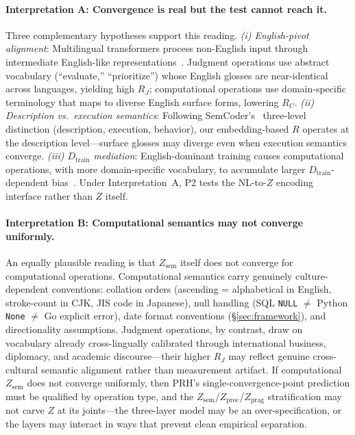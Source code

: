 \documentclass[11pt]{article}
\theoremstyle{definition}
\newcommand{\Zsem}{Z_{\text{sem}}}
\newcommand{\Zproc}{Z_{\text{proc}}}
\newcommand{\Zprag}{Z_{\text{prag}}}
\newcommand{\Dtrain}{D_{\text{train}}}
\begin{document}
\paragraph{Interpretation A: Convergence is real but the test cannot reach it.}
Three complementary hypotheses support this reading. \emph{(i) English-pivot alignment}: Multilingual transformers process non-English input through intermediate English-like representations~\cite{wendler2024llamas}. Judgment operations use abstract vocabulary (``evaluate,'' ``prioritize'') whose English glosses are near-identical across languages, yielding high $R_J$; computational operations use domain-specific terminology that maps to diverse English surface forms, lowering $R_C$. \emph{(ii) Description vs.\ execution semantics}: Following SemCoder's~\cite{wan2024semcoder} three-level distinction (description, execution, behavior), our embedding-based $R$ operates at the description level---surface glosses may diverge even when execution semantics converge. \emph{(iii) $\Dtrain$ mediation}: English-dominant training causes computational operations, with more domain-specific vocabulary, to accumulate larger $\Dtrain$-dependent bias~\cite{wu2025semantichub}. Under Interpretation~A, P2 tests the NL-to-$Z$ encoding interface rather than $Z$ itself.

\paragraph{Interpretation B: Computational semantics may not converge uniformly.}
An equally plausible reading is that $\Zsem$ itself does not converge for computational operations. Computational semantics carry genuinely culture-dependent conventions: collation orders (ascending = alphabetical in English, stroke-count in CJK, JIS code in Japanese), null handling (SQL \texttt{NULL} $\neq$ Python \texttt{None} $\neq$ Go explicit error), date format conventions (\S\ref{sec:framework}), and directionality assumptions. Judgment operations, by contrast, draw on vocabulary already cross-lingually calibrated through international business, diplomacy, and academic discourse---their higher $R_J$ may reflect genuine cross-cultural semantic alignment rather than measurement artifact. If computational $\Zsem$ does not converge uniformly, then PRH's single-convergence-point prediction must be qualified by operation type, and the $\Zsem$/$\Zproc$/$\Zprag$ stratification may not carve $Z$ at its joints---the three-layer model may be an over-specification, or the layers may interact in ways that prevent clean empirical separation.
\end{document}
